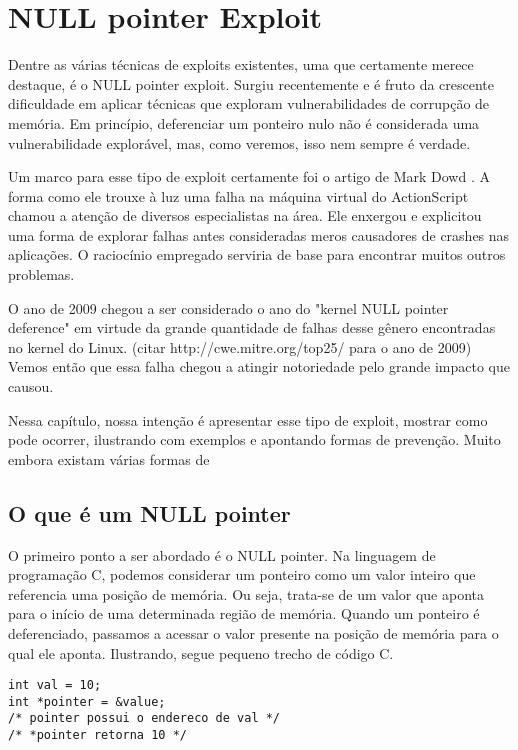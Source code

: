 
\chapter{NULL pointer Exploit}
\label{chap:null_pointer_exploit}

	Dentre as várias técnicas de exploits existentes, uma que certamente merece
	destaque, é o NULL pointer exploit.
	Surgiu recentemente e é fruto da crescente dificuldade em aplicar técnicas
	que exploram vulnerabilidades de corrupção de memória.
	Em princípio, deferenciar um ponteiro nulo não é considerada
	uma vulnerabilidade explorável, mas, como veremos, isso nem sempre é verdade.

	
	Um marco para esse tipo de exploit certamente foi o artigo de Mark Dowd \cite{Dowd2008}.
	A forma como ele trouxe à luz uma falha na máquina virtual do ActionScript chamou
	a atenção de diversos especialistas na área. Ele enxergou e explicitou uma forma
	de explorar falhas antes consideradas meros causadores de crashes nas aplicações.
	O raciocínio empregado serviria de base para encontrar muitos outros problemas.

	
	O ano de 2009 chegou a ser considerado o ano do "kernel NULL pointer deference"
	em virtude da grande quantidade de falhas desse gênero encontradas no kernel do Linux.
	(citar http://cwe.mitre.org/top25/ para o ano de 2009)
	Vemos então que essa falha chegou a atingir notoriedade pelo grande impacto que causou.

	
	Nessa capítulo, nossa intenção é apresentar esse tipo de exploit, mostrar como 
	pode ocorrer, ilustrando com exemplos e apontando formas de prevenção.
	Muito embora existam várias formas de 
	
	
	\section{O que é um NULL pointer}
		O primeiro ponto a ser abordado é o NULL pointer.
		Na linguagem de programação C, podemos considerar um ponteiro como um valor inteiro
		que referencia uma posição de memória. Ou seja, trata-se de um valor que aponta
		para o início de uma determinada região de memória. Quando um ponteiro é deferenciado,
		passamos a acessar o valor presente na posição de memória para o qual ele aponta.
		Ilustrando, segue pequeno trecho de código C.
		\begin{lstlisting}[label=pointer_example,caption=Ponteiro em C]
int val = 10;
int *pointer = &value;
/* pointer possui o endereco de val */
/* *pointer retorna 10 */
		\end{lstlisting}
		

